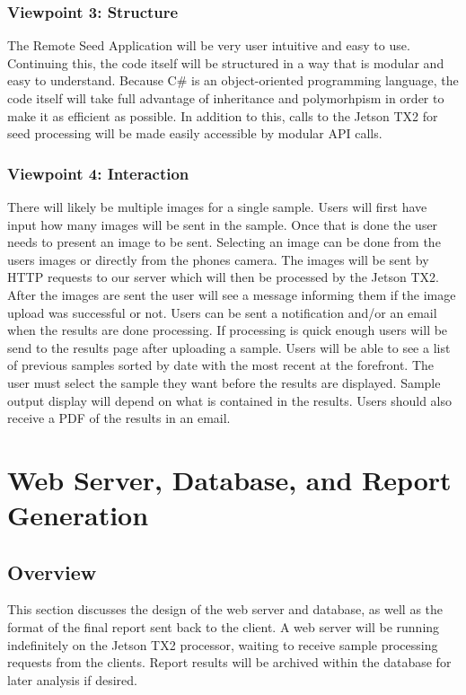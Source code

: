 \documentclass[onecolumn, draftclsnofoot,10pt, compsoc]{IEEEtran}
\begin{document}
        \subsubsection{Viewpoint 3: Structure}
        	The Remote Seed Application will be very user intuitive and easy to use. Continuing this, the code itself will be structured in a way that is modular and easy to understand. Because C\# is an object-oriented programming language, the code itself will take full advantage of inheritance and polymorhpism in order to make it as efficient as possible. In addition to this, calls to the Jetson TX2 for seed processing will be made easily accessible by modular API calls.
        	
        \subsubsection{Viewpoint 4: Interaction}
        	There will likely be multiple images for a single sample.
		    Users will first have input how many images will be sent in the sample.
		    Once that is done the user needs to present an image to be sent.
		    Selecting an image can be done from the users images or directly from the phones camera.
		    The images will be sent by HTTP requests to our server which will then be processed by the Jetson TX2.
		    After the images are sent the user will see a message informing them if the image upload was successful or not.
		    Users can be sent a notification and/or an email when the results are done processing.
		    If processing is quick enough users will be send to the results page after uploading a sample.
		    Users will be able to see a list of previous samples sorted by date with the most recent at the forefront.
		    The user must select the sample they want before the results are displayed.
		    Sample output display will depend on what is contained in the results.
		    Users should also receive a PDF of the results in an email.

\section{Web Server, Database, and Report Generation }
\subsection{Overview}
This section discusses the design of the web server and database, as well as the format of the final report sent back to the client. A web server will be running indefinitely on the Jetson TX2 processor, waiting to receive sample processing requests from the clients. Report results will be archived within the database for later analysis if desired. 
\end{document}
